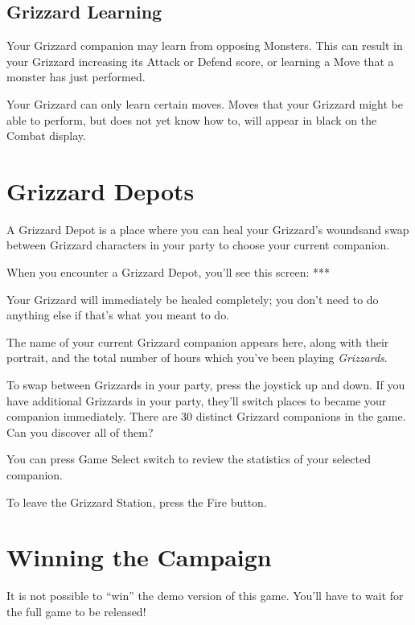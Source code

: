 \documentclass[12pt,twoside,openright,book]{memoir}
\begin{document}
\subsection{Grizzard Learning}

Your  Grizzard companion  may  learn from  opposing  Monsters. This  can
result  in your  Grizzard  increasing  its Attack  or  Defend score,  or
learning a Move that a monster has just performed.

Your Grizzard  can only  learn certain moves.  Moves that  your Grizzard
might be able to  perform, but does not yet know how  to, will appear in
black on the Combat display.

\section{Grizzard Depots}\label{Grizzard Depots}

A  Grizzard  Depot  is  a  place where  you  can  heal  your  Grizzard's
wounds\ifdef\DEMO\else  and swap  between  Grizzard  characters in  your
party to choose your current companion\fi.

When you encounter a Grizzard Depot, you'll see this screen: ***

Your Grizzard will  immediately be healed completely; you  don't need to
do anything else if that's what you meant to do.

The name  of your  current Grizzard companion  appears here,  along with
their  portrait,  and  the  total  number of  hours  which  you've  been
playing \textit{Grizzards}.

\ifdef\DEMO\else
To swap between Grizzards in your party, press the joystick up and down.
If you have additional Grizzards in your party, they'll switch places to
became  your  companion  immediately.  There are  30  distinct  Grizzard
companions in the game. Can you discover all of them?
\fi

You  can press  Game  Select switch  to review  the  statistics of  your
selected companion.

To leave the Grizzard Station, press the Fire button.


\section{Winning the Campaign}\label{Winning the Campaign}

\ifdef\DEMO

It is not possible to ``win'' the demo version of this game. You'll have
to wait for the full game to be released!
\end{document}
